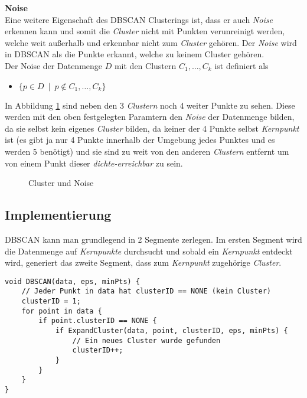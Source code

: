 \documentclass{lni}
\begin{document}
    
\textbf{Noise}\\
Eine weitere Eigenschaft des DBSCAN Clusterings ist, dass er auch \textit{Noise} erkennen kann und somit die \textit{Cluster} nicht mit Punkten verunreinigt werden, welche weit außerhalb und erkennbar nicht zum \textit{Cluster} gehören. Der \textit{Noise} wird in DBSCAN als die Punkte erkannt, welche zu keinem Cluster gehören.\\
Der Noise der Datenmenge $D$ mit den Clustern $C_1,\dots,C_k$ ist definiert als
\begin{itemize}
    \item $ \{ p \in D \enspace | \enspace p \notin C_1,\dots,C_k \} $
\end{itemize}
In Abbildung \ref{fig:3} sind neben den 3 \textit{Clustern} noch 4 weiter Punkte zu sehen. Diese werden mit den oben festgelegten Paramtern den \textit{Noise} der Datenmenge bilden, da sie selbst kein eigenes \textit{Cluster} bilden, da keiner der 4 Punkte selbst \textit{Kernpunkt} ist (es gibt ja nur 4 Punkte innerhalb der Umgebung jedes Punktes und es werden 5 benötigt) und sie sind zu weit von den anderen \textit{Clustern} entfernt um von einem Punkt dieser \textit{dichte-erreichbar} zu sein.


\begin{figure}[hb]
    \centering
    
    \caption{Cluster und Noise}
    \label{fig:3}
\end{figure}

%
%

\subsection{Implementierung}
\label{sec:impl}
DBSCAN kann man grundlegend in 2 Segmente zerlegen. Im ersten Segment wird die Datenmenge auf \textit{Kernpunkte} durchsucht und sobald ein \textit{Kernpunkt} entdeckt wird, generiert das zweite Segment, dass zum \textit{Kernpunkt} zugehörige \textit{Cluster}.

\begin{lstlisting}[caption={DBSCAN},label={lst:dbscan}]
void DBSCAN(data, eps, minPts) {
    // Jeder Punkt in data hat clusterID == NONE (kein Cluster)
    clusterID = 1;
    for point in data {
        if point.clusterID == NONE {
            if ExpandCluster(data, point, clusterID, eps, minPts) {
                // Ein neues Cluster wurde gefunden
                clusterID++;
            }
        }
    }
}
\end{lstlisting}
\end{document}
